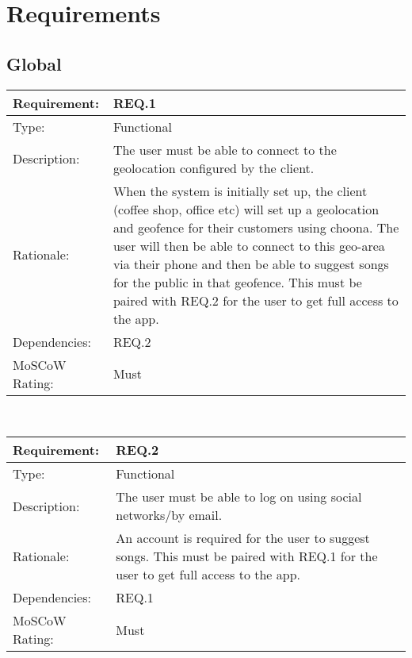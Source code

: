\section{Requirements}

\subsection*{Global}

\noindent
\begin{tabular}{|l || p{12.0cm}|}
  \hline
  Requirement:       & REQ.1 \\ \hline
  Type:              & Functional \\ \hline
  Description:       & The user must be able to connect to the geolocation configured by the client. \\ \hline
  Rationale:         & When the system is initially set up, the client (coffee shop, office etc) will set up a geolocation and geofence for their customers using choona. The user will then be able to connect to this geo-area via their phone and then be able to suggest songs for the public in that geofence. This must be paired with REQ.2 for the user to get full access to the app. \\ \hline
  Dependencies:      & REQ.2 \\ \hline
  MoSCoW Rating:     & Must \\
\hline
\end{tabular}\\

\vspace{0.5cm}

\noindent
\begin{tabular}{|l || p{12.0cm}|}
  \hline
  Requirement:       & REQ.2 \\ \hline
  Type:              & Functional \\ \hline
  Description:       & The user must be able to log on using social networks/by email. \\ \hline
  Rationale:         & An account is required for the user to suggest songs. This must be paired with REQ.1 for the user to get full access to the app. \\ \hline
  Dependencies:      & REQ.1 \\ \hline
  MoSCoW Rating:     & Must \\
\hline
\end{tabular}\\

\vspace{0.5cm}

